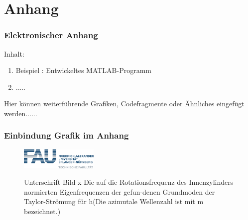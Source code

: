 

\renewcommand{\thefigure}{A\arabic{figure}} 
\chapter{Anhang}

\subsection*{Elektronischer Anhang }

Inhalt: 

\begin{enumerate}
\item  Beispiel : Entwickeltes MATLAB-Programm
\item  .....
\end{enumerate}

Hier können weiterführende Grafiken, Codefragmente oder Ähnliches eingefügt werden......


 \subsection*{Einbindung Grafik im Anhang}
  \begin{figure}[h!]
  \begin{centering}
  {\includegraphics[width=0.33\textwidth]{Abbildungen/fau.png}}
   \caption{Unterschrift Bild x Die auf die Rotationsfrequenz des Innenzylinders normierten Eigenfrequenzen der gefun-denen Grundmoden der Taylor-Strömung für h(Die azimutale Wellenzahl ist mit m  bezeichnet.)}
  \end{centering}
  \end{figure}








